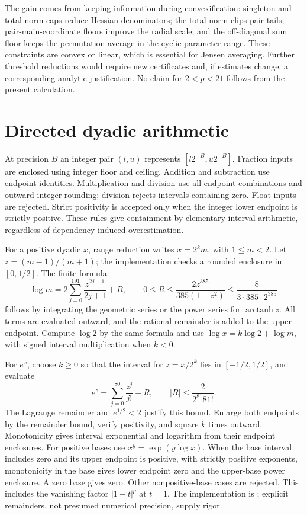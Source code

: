 \documentclass[11pt,a4paper]{article}
\theoremstyle{remark}\newtheorem{remark}[theorem]{Remark}
\begin{document}
The gain comes from keeping information during convexification:
singleton and total norm caps reduce Hessian denominators; the total norm
clips pair tails; pair-main-coordinate floors improve the radial scale;
and the off-diagonal sum floor keeps the permutation average in the
cyclic parameter range. These constraints are convex or linear, which is
essential for Jensen averaging. Further threshold reductions would
require new certificates and, if estimates change, a corresponding
analytic justification. No claim for $2<p<21$ follows from the present
calculation.

\appendix
\section{Directed dyadic arithmetic}\label{app:arith}
At precision $B$ an integer pair $(l,u)$ represents
$[l2^{-B},u2^{-B}]$. Fraction inputs are enclosed using integer floor and
ceiling. Addition and subtraction use endpoint identities. Multiplication
and division use all endpoint combinations and outward integer rounding;
division rejects intervals containing zero. Float inputs are rejected.
Strict positivity is accepted only when the integer lower endpoint is
strictly positive. These rules give containment by elementary interval
arithmetic, regardless of dependency-induced overestimation.

For a positive dyadic $x$, range reduction writes $x=2^km$, with
$1\le m<2$. Let $z=(m-1)/(m+1)$; the implementation checks a rounded
enclosure in $[0,1/2]$. The finite formula
\[
\log m=2\sum_{j=0}^{191}\frac{z^{2j+1}}{2j+1}+R,\qquad
0\le R\le\frac{2z^{385}}{385(1-z^2)}
\le\frac8{3\cdot385\cdot2^{385}}
\]
follows by integrating the geometric series or the power series for
$\operatorname{arctanh}z$. All terms are evaluated outward, and the
rational remainder is added to the upper endpoint. Compute $\log2$ by
the same formula and use $\log x=k\log2+\log m$, with signed interval
multiplication when $k<0$.

For $e^x$, choose $k\ge0$ so that the interval for $z=x/2^k$ lies
in $[-1/2,1/2]$, and evaluate
\[
e^z=\sum_{j=0}^{80}\frac{z^j}{j!}+R,\qquad
|R|\le\frac2{2^{81}81!}.
\]
The Lagrange remainder and $e^{1/2}<2$ justify this bound.
Enlarge both endpoints by the remainder bound, verify positivity,
and square $k$ times outward. Monotonicity gives interval exponential
and logarithm from their endpoint enclosures. For positive bases use
$x^y=\exp(y\log x)$. When the base interval includes zero and its upper
endpoint is positive, with strictly positive exponents, monotonicity in
the base gives lower endpoint zero and the upper-base power enclosure.
A zero base gives zero. Other nonpositive-base cases are rejected.
This includes the vanishing factor $|1-t|^p$ at $t=1$.
The implementation is ; explicit
remainders, not presumed numerical precision, supply rigor.
\end{document}
